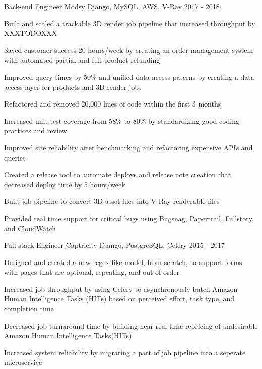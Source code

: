 \begin{cventries}
  \cventry
    {Back-end Engineer}
    {Modsy}
    {Django, MySQL, AWS, V-Ray}
    {2017 - 2018}
    {
      \begin{cvitems}
        \item {Built and scaled a trackable 3D render job pipeline that increased throughput by XXXTODOXXX}
        \item {Saved customer success 20 hours/week by creating an order management system with automated partial and full product refunding}
        \item {Improved query times by 50\% and unified data access paterns by creating a data access layer for products and 3D render jobs}
        \item {Refactored and removed 20,000 lines of code within the first 3 months}
        \item {Increased unit test coverage from 58\% to 80\% by standardizing good coding practices and review}
        \item {Improved site reliability after benchmarking and refactoring expensive APIs and queries}
        \item {Created a release tool to automate deploys and release note creation that decreased deploy time by 5 hours/week}
        \item {Built job pipeline to convert 3D asset files into V-Ray renderable files}
        \item {Provided real time support for critical bugs using Bugsnag, Papertrail, Fullstory, and CloudWatch}
      \end{cvitems}
    }
  \cventry
    {Full-stack Engineer}
    {Captricity}
    {Django, PostgreSQL, Celery}
    {2015 - 2017}
    {
      \begin{cvitems}
        \item {Designed and created a new regex-like model, from scratch, to support forms with pages that are optional, repeating, and out of order}
        \item {Increased job throughput by using Celery to asynchronously batch Amazon Human Intelligence Tasks (HITs) based on perceived effort, task type, and completion time}
        \item {Decreased job turnaround-time by building near real-time repricing of undesirable Amazon Human Intelligence Tasks(HITs)}
        \item {Increased system reliability by migrating a part of job pipeline into a seperate microservice}

\end{cvitems}}
\end{cventries}
